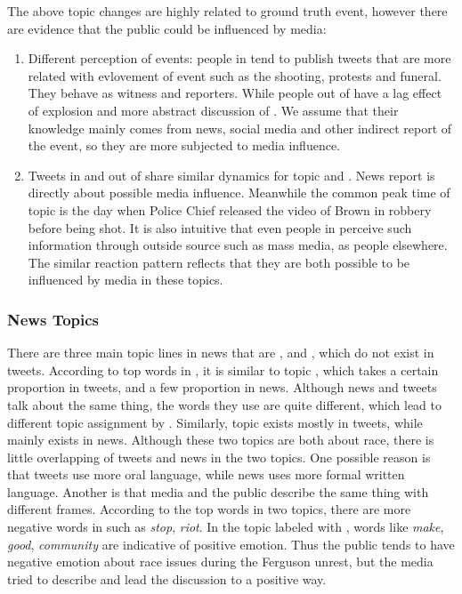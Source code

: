 The above topic changes are highly related to ground truth event, however there are evidence that the public could be influenced by media:
\begin{enumerate}
\item Different perception of events: people in \stlouis tend to publish tweets that are more related with evlovement of event such as the shooting, protests and funeral. They behave as witness and reporters. While people out of \stlouis have a lag effect of \emotion explosion and more abstract discussion of \racism. We assume that their knowledge mainly comes from news, social media and other indirect report of the event, so they are more subjected to media influence.
\item Tweets in and out of \stlouis share similar dynamics for topic \newsreport and \michaelbrown. News report is directly about possible media influence. Meanwhile the common peak time of topic \michaelbrown is the day when Police Chief released the video of Brown in robbery before being shot. It is also intuitive that even people in \stlouis perceive such information through outside source such as mass media, as people elsewhere. The similar reaction pattern reflects that they are both possible to be influenced by media in these topics.
\end{enumerate}

\subsubsection{News Topics}
There are three main topic lines in news that are \obamatalk, \shootincident and \raceandcommunity, which do not exist in tweets. According to top words in \shootincident, it is similar to topic \michaelbrown, which takes a certain proportion in tweets, and a few proportion in news. Although news and tweets talk about the same thing, the words they use are quite different, which lead to different topic assignment by \stlda. Similarly, \racism topic exists mostly in tweets, while \raceandcommunity mainly exists in news. Although these two topics are both about race, there is little overlapping of tweets and news in the two topics. One possible reason is that tweets use more oral language, while news uses more formal written language. Another is that media and the public describe the same thing with different frames. According to the top words in two topics, there are more negative words in \racism such as \emph{stop}, \emph{riot}. In the topic labeled with \raceandcommunity, words like \emph{make}, \emph{good}, \emph{community} are indicative of positive emotion. Thus the public tends to have negative emotion about race issues during the Ferguson unrest, but the media tried to describe and lead the discussion to a positive way.

